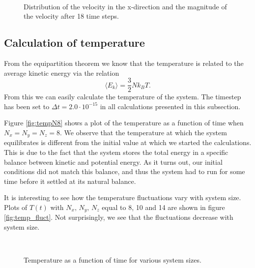 \documentclass[12pt]{article}
\newcommand{\bdi}{\begin{displaymath}}
\newcommand{\edi}{\end{displaymath}}
\begin{document}
\begin{figure}[!ht]
    \begin{center}
        \hspace{5mm}
        \\ 
    \end{center}
    \caption{Distribution of the velocity in the x-direction and the magnitude of the velocity after 18 time steps.}
    \label{fig:zoom_energies}
\end{figure}



\subsection{Calculation of temperature}
From the equipartition theorem we know that the temperature is related to the average kinetic energy via the relation
\bdi
\langle E_k \rangle = \frac{3}{2}Nk_BT.
\edi
From this we can easily calculate the temperature of the system. The timestep has been set to $\Delta t = 2.0\cdot10^{-15}$ in all calculations presented in this subsection.

Figure \ref{fig:tempN8} shows a plot of the temperature as a function of time when $N_x = N_y = N_z = 8$.
We observe that the temperature at which the system equilibrates is different from the initial value at which we started
the calculations. This is due to the fact that the system stores the total energy in a specific balance between kinetic and potential energy. As it turns out, our initial conditions did not
match this balance, and thus the system had to run for some time before it settled at its natural balance.

It is interesting to see how the temperature fluctuations vary with system size. Plots of $T(t)$ with $N_x,\,N_y,\,N_z$ equal to 8, 10 and 14 are shown in figure \ref{fig:temp_fluct}.
Not surprisingly, we see that the fluctuations decrease with system size.

\begin{figure}[!ht]
    \begin{center}
        \hspace{5mm}
        \\ 
    \end{center}
    \caption{Temperature as a function of time for various system sizes.}
    \label{fig:temp}
\end{figure}
\end{document}
